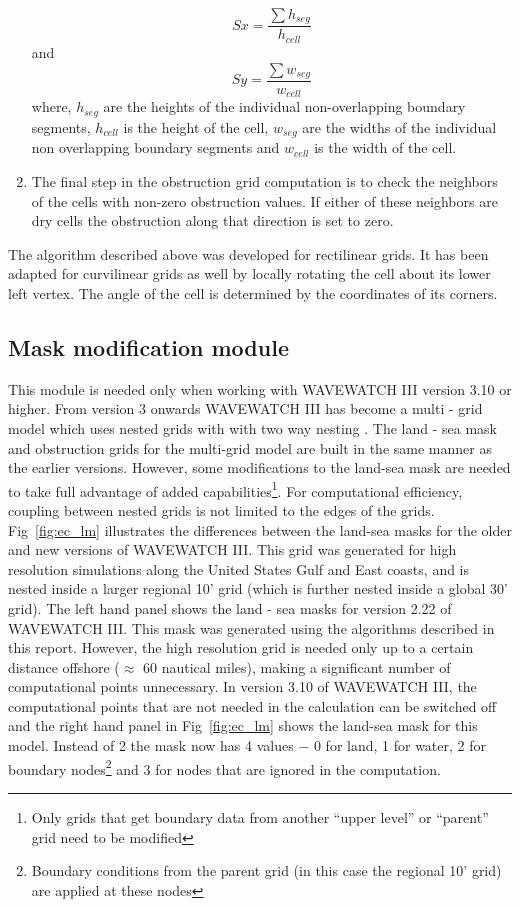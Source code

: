 \documentclass[12pt]{article}
\begin{document}
\begin{enumerate}
\[ Sx = \frac{\sum h_{seg}}{h_{cell}} \] and \[ Sy = \frac{\sum w_{seg}}{w_{cell}} \]
where, $h_{seg}$ are the heights of the individual non-overlapping boundary segments, $h_{cell}$ is the height of the cell, $w_{seg}$ are the widths of the individual non overlapping boundary segments and $w_{cell}$ is the width of the cell. \label{it_obg:4}
\item The final step in the obstruction grid computation is to check the neighbors of the cells with non-zero obstruction values. If either of these neighbors are dry cells the obstruction along that direction is set to zero. \label{it_obg:5} 
\end{enumerate}

The algorithm described above was developed for rectilinear grids. It has been adapted for curvilinear grids as well by locally rotating the cell about its lower left vertex. The angle of the cell is determined by the coordinates of its corners.

\subsection {Mask modification module}

This module is needed only when working with WAVEWATCH III version 3.10 or higher. From version 3 onwards WAVEWATCH III has become a multi - grid model which uses nested grids with with two way nesting \cite[]{tolman-2006}. The land - sea mask and obstruction grids for the multi-grid model are built in the same manner as the earlier versions. However, some modifications to the land-sea mask are needed to take full advantage of added capabilities\footnote{Only grids that get boundary data from another ``upper level'' or ``parent'' grid need to be modified}. For computational efficiency, coupling between nested grids is not limited to the edges of the grids. Fig~\ref{fig:ec_lm} illustrates the differences between the land-sea masks for the older and new versions of WAVEWATCH III. This grid was generated for high resolution simulations along the United States Gulf and East coasts, and is nested inside a larger regional 10' grid (which is further nested inside a global 30' grid). The left hand panel shows the land - sea masks for version 2.22 of WAVEWATCH III. This mask was generated using the algorithms described in this report. However, the high resolution grid is needed only up to a certain distance offshore ($\approx$ 60 nautical miles), making a significant number of computational points unnecessary. In version 3.10 of WAVEWATCH III, the computational points that are not needed in the calculation can be switched off and the right hand panel in Fig~\ref{fig:ec_lm} shows the land-sea mask for this model. Instead of 2 the mask now has 4 values $-$ 0 for land, 1 for water, 2 for boundary nodes\footnote{Boundary conditions from the parent grid (in this case the regional 10' grid) are applied at these nodes} and 3 for nodes that are ignored in the computation.   
\end{document}
